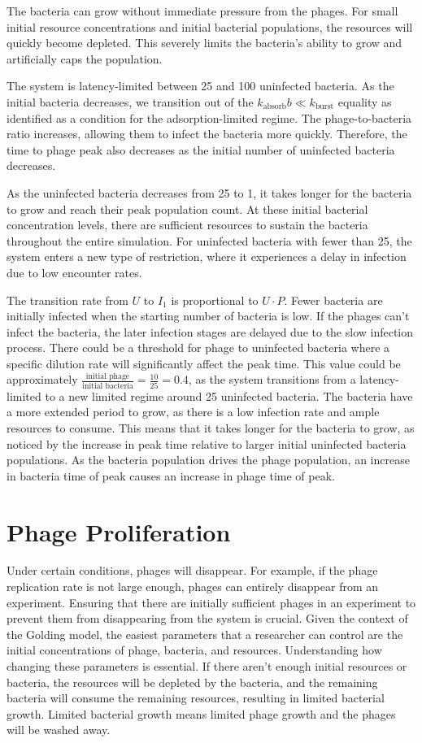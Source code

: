 The bacteria can grow without immediate pressure from the phages. 
For small initial resource concentrations and initial bacterial populations, the resources will quickly become depleted. 
This severely limits the bacteria's ability to grow and artificially caps the population. 

The system is latency-limited between 25 and 100 uninfected bacteria. 
As the initial bacteria decreases, we transition out of the $k_{\text{absorb}}b \ll k_{\text{burst}}$ equality as identified as a condition for the adsorption-limited regime. 
The phage-to-bacteria ratio increases, allowing them to infect the bacteria more quickly. 
Therefore, the time to phage peak also decreases as the initial number of uninfected bacteria decreases. 

As the uninfected bacteria decreases from 25 to 1, it takes longer for the bacteria to grow and reach their peak population count. 
At these initial bacterial concentration levels, there are sufficient resources to sustain the bacteria throughout the entire simulation. 
For uninfected bacteria with fewer than 25, the system enters a new type of restriction, where it experiences a delay in infection due to low encounter rates. 

The transition rate from $U$ to $I_1$ is proportional to $U\cdot P$. 
Fewer bacteria are initially infected when the starting number of bacteria is low. 
If the phages can't infect the bacteria, the later infection stages are delayed due to the slow infection process. 
There could be a threshold for phage to uninfected bacteria where a specific dilution rate will significantly affect the peak time. 
This value could be approximately $\frac{\text{initial phage}}{\text{initial bacteria}} = \frac{10}{25} = 0.4$, as the system transitions from a latency-limited to a new limited regime around 25 uninfected bacteria. 
The bacteria have a more extended period to grow, as there is a low infection rate and ample resources to consume. 
This means that it takes longer for the bacteria to grow, as noticed by the increase in peak time relative to larger initial uninfected bacteria populations. 
As the bacteria population drives the phage population, an increase in bacteria time of peak causes an increase in phage time of peak. 

\section{Phage Proliferation}
Under certain conditions, phages will disappear. 
For example, if the phage replication rate is not large enough, phages can entirely disappear from an experiment. 
Ensuring that there are initially sufficient phages in an experiment to prevent them from disappearing from the system is crucial. 
Given the context of the Golding model, the easiest parameters that a researcher can control are the initial concentrations of phage, bacteria, and resources. 
Understanding how changing these parameters is essential. 
If there aren't enough initial resources or bacteria, the resources will be depleted by the bacteria, and the remaining bacteria will consume the remaining resources, resulting in limited bacterial growth. 
Limited bacterial growth means limited phage growth and the phages will be washed away. 

